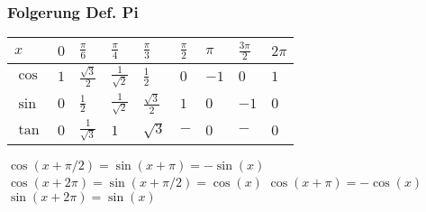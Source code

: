 \subsubsection*{Folgerung Def. Pi}
\renewcommand{\arraystretch}{1.5}
\begin{tabular}{m{1.1em}m{0.2em}m{0.2em}m{0.2em}m{0.2em}m{0.2em}m{0.2em}m{0.2em}m{0.2em}}
    $x$ & $0$& $\frac{\pi}{6}$ & $\frac{\pi}{4}$ & $\frac{\pi}{3}$ & $\frac{\pi}{2}$ & $\pi$ & $\frac{3\pi}{2}$ & $2\pi$ \\\hline
    $\cos $ & $1$ & $\frac{\sqrt{3}}{2}$       & $\frac{1}{\sqrt{2}}$ & $\frac{1}{2}$        & $0$  & $-1$ & $0$  & $1$ \\\hline
    $\sin $ & $0$ & $\frac{1}{2}$              & $\frac{1}{\sqrt{2}}$ & $\frac{\sqrt{3}}{2}$ & $1$  & $0$  & $-1$ & $0$ \\\hline
    $\tan $ & $0$ & $\frac{1}{\sqrt{3}}$       & $1                 $ & $\sqrt{3}$           & $-$    & $0$   & $-$   & $0$\\
\end{tabular}
$\cos(x + \pi/2) = \sin(x + \pi) =  - \sin(x)$\\
$\cos(x + 2 \pi) = \sin(x + \pi/2) = \cos(x)$
$\cos(x + \pi) = -\cos(x)$\\
$\sin(x + 2\pi) = \sin(x)$
\renewcommand{\arraystretch}{0.5}%


